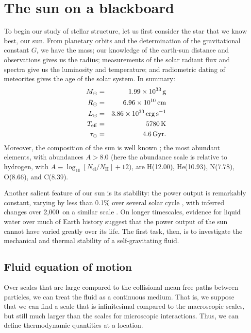 \chapter{The sun on a blackboard}\label{ch.introduction}

To begin our study of stellar structure, let us first consider the star that we know best, our sun.  From planetary orbits and the determination of the gravitational constant $G$, we have the mass; our knowledge of the earth-sun distance and observations gives us the radius; measurements of the solar radiant flux and spectra give us the luminosity and temperature; and radiometric dating of meteorites gives the age of the solar system. In summary:
\begin{eqnarray*}
M_{\odot} &=& 1.99\times 10^{33}\,\mathrm{g}\\
R_{\odot} &=& 6.96\times 10^{10}\,\mathrm{c}\mathrm{m}\\
L_{\odot} &=& 3.86\times 10^{33}\,\mathrm{erg}\,{\mathrm{s}}^{-1}\\
T_{\mathrm{eff}} &=& 5780\,\mathrm{K}\\
\tau_{\odot} &=& 4.6\,\mathrm{G}\mathrm{yr}.
\end{eqnarray*}
Moreover, the composition of the sun is well known \citep{anders.grevesse:abundances,Asplund2005The-Solar-Chemi}; the most abundant elements, with abundances $A > 8.0$ (here the abundance scale is relative to hydrogen, with $A \equiv \log_{10}[N_{\mathrm{el}}/N_{\mathrm{H}}] + 12$), are H(12.00), He(10.93), N(7.78), O(8.66), and C(8.39).

Another salient feature of our sun is its stability: the power output is remarkably constant, varying by less than 0.1\% over several solar cycle \citep{Willson1991The-suns-lumino,Frohlich2004Solar-radiative}, with inferred changes over 2,000\nsp\yr\ on a similar scale \citep{Frohlich2004Solar-radiative}.  On longer timescales, evidence for liquid water over much of Earth history suggest that the power output of the sun cannot have varied greatly over its life.  The first task, then, is to investigate the mechanical and thermal stability of a self-gravitating fluid.

\section{Fluid equation of motion}\label{s.fluid-introduction}

Over scales that are large compared to the collisional mean free paths between particles, we can treat the fluid as a continuous medium.  That is, we suppose that we can find a scale that is infinitesimal compared to the macroscopic scales, but still much larger than the scales for microscopic interactions. Thus, we can define thermodynamic quantities at a location.

